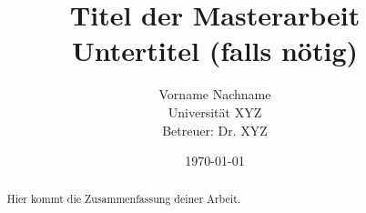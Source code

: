 \documentclass[a4paper,12pt]{report}
\title{\textbf{Titel der Masterarbeit} \\ \Large Untertitel (falls nötig)}
\author{Vorname Nachname \\ Universität XYZ \\ Betreuer: Dr. XYZ}
\date{\today}
\begin{document}
	
	\maketitle
	\thispagestyle{empty}
	\newpage
	
	\begin{abstract}
		Hier kommt die Zusammenfassung deiner Arbeit.
	\end{abstract}
	\newpage
	
	\tableofcontents
	\newpage
	
	\listoffigures
	\listoftables
	\newpage
	
	
	
	
	\printbibliography
	
	\appendix
	
	
\end{document}
